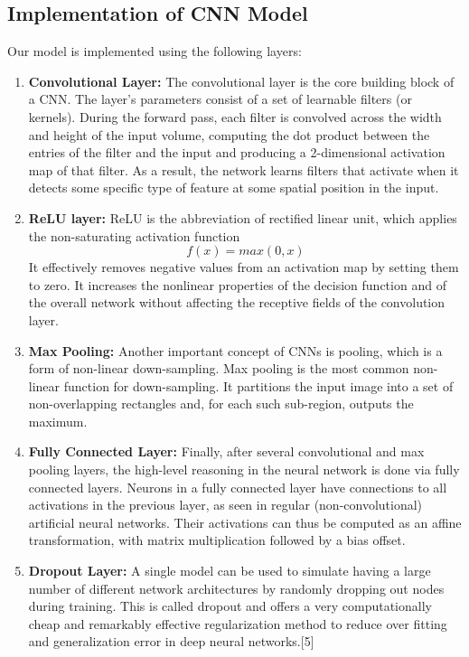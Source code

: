 \documentclass[12pt]{article}
\begin{document}
\subsection{Implementation of CNN Model}
\label{sec:model_def}
Our model is implemented using the following layers: 
\begin{enumerate}
	\item {\textbf{Convolutional Layer:}} The convolutional layer is the core building block of a CNN. The layer's parameters consist of a set of learnable filters (or kernels). During the forward pass, each filter is convolved across the width and height of the input volume, computing the dot product between the entries of the filter and the input and producing a 2-dimensional activation map of that filter. As a result, the network learns filters that activate when it detects some specific type of feature at some spatial position in the input.
	
	\item {\textbf{ReLU layer:}} ReLU is the abbreviation of rectified linear unit, which applies the non-saturating activation function 
\begin{equation}	
	f(x)=max(0, x)
\end{equation} It effectively removes negative values from an activation map by setting them to zero. It increases the nonlinear properties of the decision function and of the overall network without affecting the receptive fields of the convolution layer. 

	\item {\textbf{Max Pooling:}} Another important concept of CNNs is pooling, which is a form of non-linear down-sampling. Max pooling is the most common non-linear function for down-sampling. It partitions the input image into a set of non-overlapping rectangles and, for each such sub-region, outputs the maximum. 
	
	\item \textbf{Fully Connected Layer:} Finally, after several convolutional and max pooling layers, the high-level reasoning in the neural network is done via fully connected layers. Neurons in a fully connected layer have connections to all activations in the previous layer, as seen in regular (non-convolutional) artificial neural networks. Their activations can thus be computed as an affine transformation, with matrix multiplication followed by a bias offset. 
	
	\item \textbf{Dropout Layer:} A single model can be used to simulate having a large number of different network architectures by randomly dropping out nodes during training. This is called dropout and offers a very computationally cheap and remarkably effective regularization method to reduce over fitting and generalization error in deep neural networks.[5]

\end{enumerate}
\end{document}
